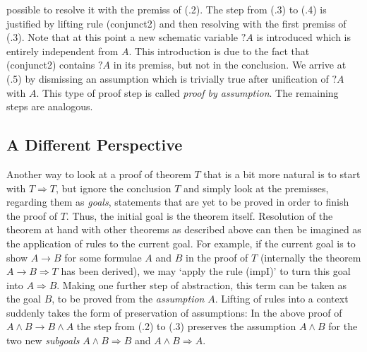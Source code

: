 \begin{expl}
  possible to resolve it with the premiss of (.2). The step from (.3) to (.4) is
  justified by lifting rule (conjunct2) and then resolving with the first
  premiss of (.3). Note that at this point a new schematic variable $?A$ is
  introduced which is entirely independent from $A$. This introduction is due to
  the fact that (conjunct2) contains $?A$ in its premiss, but not in the
  conclusion. We arrive at (.5) by dismissing an assumption which is trivially
  true after unification of $?A$ with $A$. This type of proof step is called
  \emph{proof by assumption}. The remaining steps are analogous.
\end{expl}



\subsection{A Different Perspective}
\label{sec:diff-persp}


Another way to look at a proof of theorem $T$ that is a bit more natural is to
start with $T \Longrightarrow T$, but ignore the conclusion $T$ and simply look at the
premisses, regarding them as \emph{goals}, \IE statements that are yet to be
proved in order to finish the proof of $T$. Thus, the initial goal is the
theorem itself. Resolution of the theorem at hand with other theorems as
described above can then be imagined as the application of rules to the current
goal. For example, if the current goal is to show $A \longrightarrow B$ for some formulae $A$
and $B$ in the proof of $T$ (\IE internally the theorem $A \longrightarrow B \Longrightarrow T$ has been
derived), we may `apply the rule (impI)' to turn this goal into $A \Longrightarrow B$. Making
one further step of abstraction, this term can be taken as the goal $B$, to be
proved from the \emph{assumption} $A$. Lifting of rules into a context suddenly
takes the form of preservation of assumptions: In the above proof of $A\land B\longrightarrow B\land A$
the step from (.2) to (.3) preserves the assumption $A\land B$ for the two new
\emph{subgoals} $A\land B\Longrightarrow B$ and $A\land B \Longrightarrow A$.

